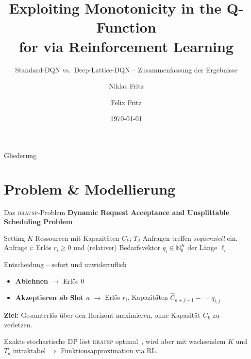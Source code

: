 \documentclass[aspectratio=169, 11pt]{beamer}
\title[Monotonicity in the Q-Function for \drausp]{Exploiting Monotonicity in the Q-Function\\for \drausp{} via Reinforcement Learning}
\subtitle{Standard-DQN vs.\ Deep-Lattice-DQN -- Zusammenfassung der Ergebnisse}
\author[N.\ Fritz, F.\ Fritz]{Niklas Fritz \and Felix Fritz}
\institute[RPTU]{RPTU Kaiserslautern-Landau}
\date{\today}
\newcommand{\drausp}{\textsc{drausp}}
\newcommand{\Chat}{\hat{C}}
\begin{document}

\begin{frame}[plain]
  \titlepage
\end{frame}

\begin{frame}{Gliederung}
  \tableofcontents
\end{frame}

\section{Problem \& Modellierung}

\begin{frame}{Das \drausp-Problem}
  \textbf{Dynamic Request Acceptance and Unsplittable Scheduling Problem}

  \begin{block}{Setting}
    $K$ Ressourcen mit Kapazitäten $C_k$; $T_d$ Anfragen treffen \emph{sequenziell} ein.
    Anfrage $i$: Erlös $r_i \ge 0$ und (relativer) Bedarfsvektor $q_i \in \mathbb{N}_0^K$ der Länge $\ell_i$.
  \end{block}

  \begin{block}{Entscheidung -- sofort und unwiderruflich}
    \begin{itemize}
      \item \textbf{Ablehnen} $\rightarrow$ Erlös $0$
      \item \textbf{Akzeptieren ab Slot $a$} $\rightarrow$ Erlös $r_i$, Kapazitäten $\Chat_{a+j-1}\!\mathrel{-}=q_{i,j}$
    \end{itemize}
  \end{block}

  \textbf{Ziel:} Gesamterlös über den Horizont maximieren, ohne Kapazität $C_k$ zu verletzen.

  \medskip
  {\small Exakte stochastische DP löst \drausp{} optimal~\cite{drausp_lion18}, wird aber mit wachsendem
  $K$ und $T_d$ intraktabel $\Rightarrow$ Funktionsapproximation via RL.}
\end{frame}
\end{document}
